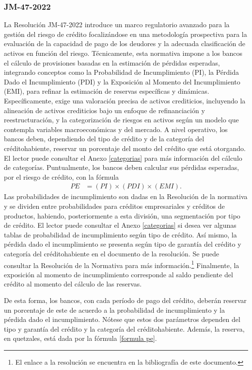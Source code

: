 \subsubsection{JM-47-2022}
La Resolución JM-47-2022 introduce un marco regulatorio avanzado para la gestión del riesgo de crédito focalizándose en una metodología prospectiva para la evaluación de la capacidad de pago de los deudores y la adecuada clasificación de activos en función del riesgo. Técnicamente, esta normativa impone a los bancos el cálculo de provisiones basadas en la estimación de pérdidas esperadas, integrando conceptos como la Probabilidad de Incumplimiento (PI), la Pérdida Dado el Incumplimiento (PDI) y la Exposición al Momento del Incumplimiento (EMI), para refinar la estimación de reservas específicas y dinámicas. Específicamente, exige una valoración precisa de activos crediticios, incluyendo la alineación de activos crediticios bajo un enfoque de refinanciación y reestructuración, y la categorización de riesgos en activos según un modelo que contempla variables macroeconómicas y del mercado. A nivel operativo, los bancos deben, dependiendo del tipo de crédito y de la categoría del créditohabiente, reservar un porcentaje del monto del crédito que está otorgando. El lector puede consultar el Anexo \ref{categorias} para más información del cálculo de categorías. Puntualmente, los bancos deben calcular sus pérdidas esperadas, por el riesgo de crédito, con la fórmula
\begin{align}\label{formula pe}
    PE &= (PI) \times (PDI) \times (EMI).
\end{align}
Las probabilidades de incumplimiento son dadas en la Resolución de la normativa y se dividen entre probabilidades para créditos empresariales y créditos de productos, habiendo, posteriormente a esta división, una segmentación por tipo de crédito. El lector puede consultar el Anexo \ref{categorias} si desea ver algunas tablas de probabilidad de incumplimiento según tipo de crédito. Así mismo, la pérdida dado el incumplimiento se presenta según tipo de garantía del crédito y categoría del créditohabiente en el documento de la resolución. Se puede consultar la Resolución de la Normativa para más información.\footnote{El enlace a la resolución se encuentra en la bibliografía de este documento.} Finalmente, la exposición al momento de incumplimiento corresponde al saldo pendiente del crédito al momento del cálculo de las reservas. 

De esta forma, los bancos, con cada período de pago del crédito, deberán reservar un porcentaje de este de acuerdo a la probabilidad de incumplimiento y la pérdida dado el incumplimiento. Nótese que estos dos parámetros dependen del tipo y garantía del crédito y la categoría del créditohabiente. Además, la reserva, en quetzales, está dada por la fórmula \ref{formula pe}. 

